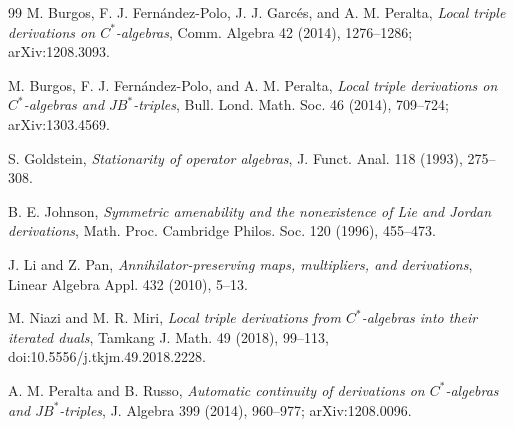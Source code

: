 \documentclass[11pt]{article}
\begin{document}
\begin{thebibliography}{99}
M. Burgos, F. J. Fern\'andez-Polo, J. J. Garc\'es, and A. M. Peralta,
\emph{Local triple derivations on $C^*$-algebras},
Comm. Algebra 42 (2014), 1276--1286; arXiv:1208.3093.

M. Burgos, F. J. Fern\'andez-Polo, and A. M. Peralta,
\emph{Local triple derivations on $C^*$-algebras and $JB^*$-triples},
Bull. Lond. Math. Soc. 46 (2014), 709--724; arXiv:1303.4569.

S. Goldstein,
\emph{Stationarity of operator algebras},
J. Funct. Anal. 118 (1993), 275--308.

B. E. Johnson,
\emph{Symmetric amenability and the nonexistence of Lie and Jordan
derivations},
Math. Proc. Cambridge Philos. Soc. 120 (1996), 455--473.

J. Li and Z. Pan,
\emph{Annihilator-preserving maps, multipliers, and derivations},
Linear Algebra Appl. 432 (2010), 5--13.

M. Niazi and M. R. Miri,
\emph{Local triple derivations from $C^*$-algebras into their iterated
duals},
Tamkang J. Math. 49 (2018), 99--113,
doi:10.5556/j.tkjm.49.2018.2228.

A. M. Peralta and B. Russo,
\emph{Automatic continuity of derivations on $C^*$-algebras and
$JB^*$-triples},
J. Algebra 399 (2014), 960--977; arXiv:1208.0096.
\end{thebibliography}
\end{document}
